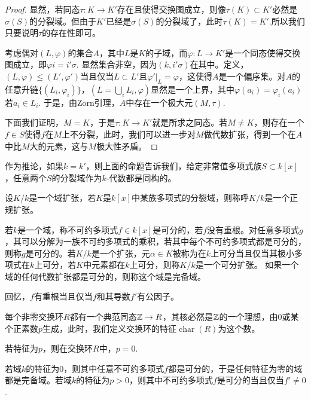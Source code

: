 \begin{proof}
    显然，若同态$\tau:K\to K'$存在且使得交换图成立，则像$\tau(K)\subset K'$必然是$\sigma(S)$的分裂域。但由于$K'$已经是$\sigma(S)$的分裂域了，此时$\tau(K)= K'$.所以我们只要说明$\tau$的存在性即可。
    
    考虑偶对$(L,\varphi)$的集合$A$，其中$L$是$K$的子域，而$\varphi:L\to K'$是一个同态使得交换图成立，即$\varphi i=i'\sigma$. 显然集合非空，因为$(k,i'\sigma)$在其中。定义，$(L,\varphi)\leq (L',\varphi')$当且仅当$L\subset L'$且$\varphi'|_L=\varphi$，这使得$A$是一个偏序集。对$A$的任意升链$\{(L_i,\varphi_i)\}$，$(L=\bigcup_i L_i,\varphi)$显然是一个上界，其中$\varphi(a_i)=\varphi_i(a_i)$若$a_i\in L_i$. 于是，由Zorn引理，$A$中存在一个极大元$(M,\tau)$.

    下面我们证明，$M=K$，于是$\tau:K\to K'$就是所求之同态。若$M\neq K$，则存在一个$f\in S$使得$f$在$M$上不分裂，此时，我们可以进一步对$M$做代数扩张，得到一个在$A$中比$M$大的元素，这与$M$极大性矛盾。
\end{proof}

作为推论，如果$k=k'$，则上面的命题告诉我们，给定非常值多项式族$S\subset k[x]$，任意两个$S$的分裂域作为$k$-代数都是同构的。

\begin{para}[正规扩张]
    设$K/k$是一个域扩张，若$K$是$k[x]$中某族多项式的分裂域，则称呼$K/k$是一个正规扩张。 
\end{para}

\begin{para}[可分扩张和完备域]
    若$k$是一个域，称不可约多项式$f\in k[x]$是可分的，若$f$没有重根。对任意多项式$g$，其可以分解为一族不可约多项式的乘积，若其中每个不可约多项式都是可分的，则称$g$是可分的。若$K/k$是一个扩张，元$\alpha\in K$被称为在$k$上可分当且仅当其极小多项式在$k$上可分，若$K$中元素都在$k$上可分，则称$K/k$是一个可分扩张。
    如果一个域的任何代数扩张都是可分的，则称这个域是完备域。
\end{para}

回忆，$f$有重根当且仅当$f$和其导数$f'$有公因子。

\begin{para}[交换环的特征]
    每个非零交换环$R$都有一个典范同态$\mathbb{Z}\to R$，其核必然是$\mathbb{Z}$的一个理想，由$0$或某个正素数$p$生成，此时，我们定义交换环的特征$\operatorname{char}(R)$为这个数。
\end{para}

若特征为$p$，则在交换环$R$中，$p=0$.

\begin{lem}
    若域$k$的特征为$0$，则其中任意不可约多项式$f$都是可分的，于是任何特征为零的域都是完备域。若域$k$的特征为$p>0$，则其中不可约多项式$f$是可分的当且仅当$f'\neq 0$.
\end{lem}

